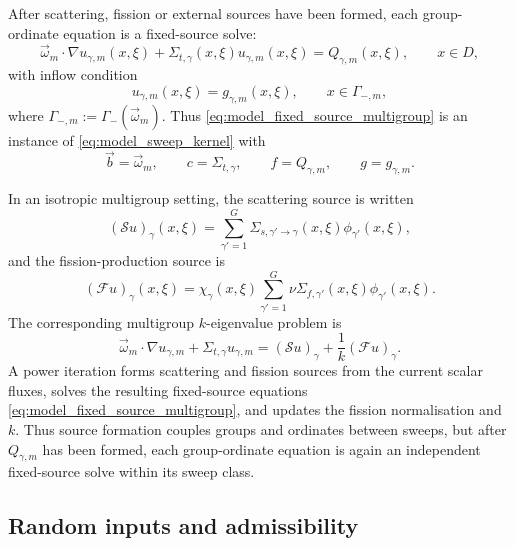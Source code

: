 \documentclass[final]{amsart}
\begin{document}
After scattering, fission or external sources have been formed, each
group-ordinate equation is a fixed-source solve:
\begin{equation}
  \vec\omega_m\cdot\nabla u_{\gamma,m}(x,\xi)
  +
  \Sigma_{t,\gamma}(x,\xi)u_{\gamma,m}(x,\xi)
  =
  Q_{\gamma,m}(x,\xi),
  \qquad
  x\in D,
  \label{eq:model_fixed_source_multigroup}
\end{equation}
with inflow condition
\begin{equation}
  u_{\gamma,m}(x,\xi)
  =
  g_{\gamma,m}(x,\xi),
  \qquad
  x\in\Gamma_{-,m},
  \label{eq:model_multigroup_inflow}
\end{equation}
where $\Gamma_{-,m} := \Gamma_-(\vec \omega_m)$. Thus
\eqref{eq:model_fixed_source_multigroup} is an instance of
\eqref{eq:model_sweep_kernel} with
\begin{equation}
  \vec b=\vec\omega_m,
  \qquad
  c=\Sigma_{t,\gamma},
  \qquad
  f=Q_{\gamma,m},
  \qquad
  g=g_{\gamma,m}.
  \label{eq:model_kernel_identification}
\end{equation}

In an isotropic multigroup setting, the scattering source is written
\begin{equation}
  (\mathcal{S}u)_\gamma(x,\xi)
  =
  \sum_{\gamma'=1}^{G}
  \Sigma_{s,\gamma'\to\gamma}(x,\xi)
  \phi_{\gamma'}(x,\xi),
  \label{eq:model_isotropic_scattering}
\end{equation}
and the fission-production source is
\begin{equation}
  (\mathcal{F}u)_\gamma(x,\xi)
  =
  \chi_\gamma(x,\xi)
  \sum_{\gamma'=1}^{G}
  \nu\Sigma_{f,\gamma'}(x,\xi)
  \phi_{\gamma'}(x,\xi).
  \label{eq:model_fission_source}
\end{equation}
The corresponding multigroup $k$-eigenvalue problem is
\begin{equation}
  \vec\omega_m\cdot\nabla u_{\gamma,m}
  +
  \Sigma_{t,\gamma}u_{\gamma,m}
  =
  (\mathcal{S}u)_\gamma
  +
  \frac{1}{k}(\mathcal{F}u)_\gamma.
  \label{eq:model_keff_problem}
\end{equation}
A power iteration forms scattering and fission sources from the current
scalar fluxes, solves the resulting fixed-source equations
\eqref{eq:model_fixed_source_multigroup}, and updates the fission
normalisation and $k$. Thus source formation couples groups and
ordinates between sweeps, but after $Q_{\gamma,m}$ has been formed,
each group-ordinate equation is again an independent fixed-source solve
within its sweep class.


\subsection{Random inputs and admissibility}
\end{document}
